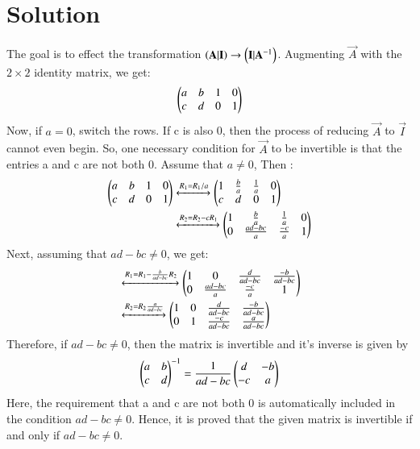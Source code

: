 \documentclass[journal,12pt,twocolumn]{IEEEtran}
\begin{document}
\section{Solution}
The goal is to effect the transformation $\left(\mathbf{A}|\mathbf{I}\right) \rightarrow \left(\mathbf{I}|\mathbf{A}^{-1}\right)$. Augmenting $\vec{A}$ with the $2 \times 2$ identity matrix, we get:
\begin{align}
 \begin{pmatrix}a & b & 1 & 0 \\ c & d & 0 & 1\end{pmatrix} 
\end{align}
Now, if $a = 0$, switch the rows. If c is also 0, then the process of reducing $\vec{A}$ to $\vec{I}$ cannot even begin. So, one necessary condition for $\vec{A}$ to be invertible is that the entries a and c are not both 0. Assume that $a \neq 0$, Then :
\begin{align}
     \begin{pmatrix}a & b & 1 & 0 \\ c & d & 0 & 1\end{pmatrix} &\xleftrightarrow{R_1 
= R_1/a} \begin{pmatrix}1 & \frac{b}{a} & \frac{1}{a} & 0 \\ c & d & 0 & 1\end{pmatrix}\\
&\xleftrightarrow{R_2 = R_2 - c R_1} \begin{pmatrix}1 & \frac{b}{a} & \frac{1}{a} & 0 \\ 0 & \frac{ad-bc}{a} & \frac{-c}{a} & 1\end{pmatrix}
\end{align}
Next, assuming that $ad - bc \neq 0$, we get:
\begin{align}
    &\xleftrightarrow{R_1 = R_1 - \frac{b}{ad-bc} R_2} \begin{pmatrix}1 & 0 & \frac{d}{ad-bc} & \frac{-b}{ad-bc} \\ 0 & \frac{ad-bc}{a} & \frac{-c}{a} & 1\end{pmatrix}\\
    &\xleftrightarrow{R_2 = R_2\frac{a}{ad-bc}} \begin{pmatrix}1 & 0 & \frac{d}{ad-bc} & \frac{-b}{ad-bc} \\ 0 & 1 & \frac{-c}{ad-bc} & \frac{a}{ad-bc}\end{pmatrix}
\end{align}
Therefore, if $ad - bc \neq 0$, then the matrix is invertible and it's inverse is given by 
\begin{align}
    \begin{pmatrix}a & b \\ c  & d\end{pmatrix}^{-1} = \frac{1}{ad-bc}\begin{pmatrix}d & -b \\ -c  & a\end{pmatrix}
\end{align}
Here, the requirement that a and c are not both 0 is automatically included in the condition $ad - bc \neq 0$. Hence, it is proved that the given matrix is invertible if and only if $ad - bc \neq 0$. 
\end{document}
